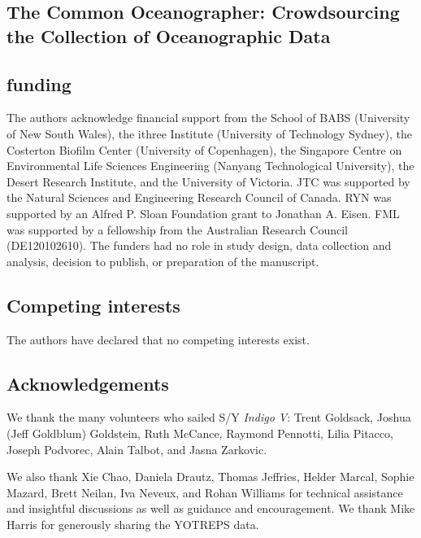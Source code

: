 \begin{refsection}

\chapter{The Common Oceanographer: Crowdsourcing the Collection of Oceanographic Data}










\section{funding}

The authors acknowledge financial support from the School of BABS (University of New South Wales), the ithree Institute (University of Technology Sydney), the Costerton Biofilm Center (University of Copenhagen), the Singapore Centre on Environmental Life Sciences Engineering (Nanyang Technological University), the Desert Research Institute, and the University of Victoria. JTC was supported by the Natural Sciences and Engineering Research Council of Canada. RYN was supported by an Alfred P. Sloan Foundation grant to Jonathan A. Eisen. FML was supported by a fellowship from the Australian Research Council (DE120102610). The funders had no role in study design, data collection and analysis, decision to publish, or preparation of the manuscript.

\section{Competing interests}

The authors have declared that no competing interests exist.

\section{Acknowledgements}

We thank the many volunteers who sailed S/Y {\em Indigo V}: Trent Goldsack, Joshua (Jeff Goldblum) Goldstein, Ruth McCance, Raymond Pennotti, Lilia Pitacco, Joseph Podvorec, Alain Talbot, and Jasna Zarkovic.

We also thank Xie Chao, Daniela Drautz, Thomas Jeffries, Helder Marcal, Sophie Mazard, Brett Neilan, Iva Neveux, and Rohan Williams for technical assistance and insightful discussions as well as guidance and encouragement. We thank Mike Harris for generously sharing the YOTREPS data.


\printbibliography[heading=subbibliography]

\end{refsection}